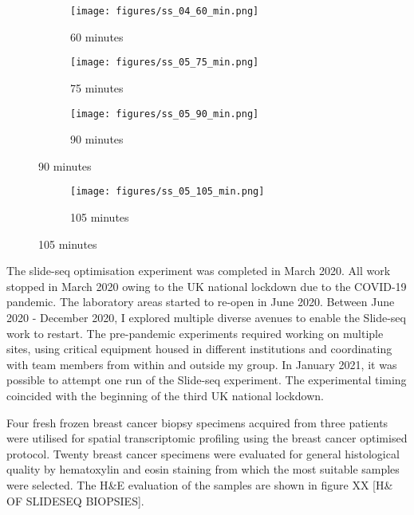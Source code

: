 \begin{figure}[ht]
	\begin{subfigure}
		\centering
		\texttt{[image: figures/ss\_04\_60\_min.png]}  
		\caption{60 minutes}
		\label{fig:ss_04_60_min}
	\end{subfigure}
	\begin{subfigure}
		\centering
		\texttt{[image: figures/ss\_05\_75\_min.png]}  
		\caption{75 minutes}
		\label{fig:ss_05_75_min}
	\end{subfigure}
	\begin{subfigure}
		\centering
		\texttt{[image: figures/ss\_05\_90\_min.png]}  
		\caption{90 minutes}
		\label{fig:ss_05_90_min}
	\end{subfigure}
\end{figure}

\begin{figure}[ht]
	\begin{subfigure}
		\centering
		\texttt{[image: figures/ss\_05\_105\_min.png]}  
		\caption{105 minutes}
		\label{fig:ss_05_105_min}
	\end{subfigure}
\end{figure}



The slide-seq optimisation experiment was completed in March 2020. All work stopped in March 2020 owing to the UK national lockdown due to the COVID-19 pandemic. The laboratory areas started to re-open in June 2020. Between June 2020 - December 2020, I explored multiple diverse avenues to enable the Slide-seq work to restart. The pre-pandemic experiments required working on multiple sites, using critical equipment housed in different institutions and coordinating with team members from within and outside my group. In January 2021, it was possible to attempt one run of the Slide-seq experiment. The experimental timing coincided with the beginning of the third UK national lockdown. 

Four fresh frozen breast cancer biopsy specimens acquired from three patients were utilised for spatial transcriptomic profiling using the breast cancer optimised protocol. Twenty breast cancer specimens were evaluated for general histological quality by hematoxylin and eosin  staining from which the most suitable samples were selected. The H{\&}E evaluation of the samples are shown in figure XX [H{\&} OF SLIDESEQ BIOPSIES].

